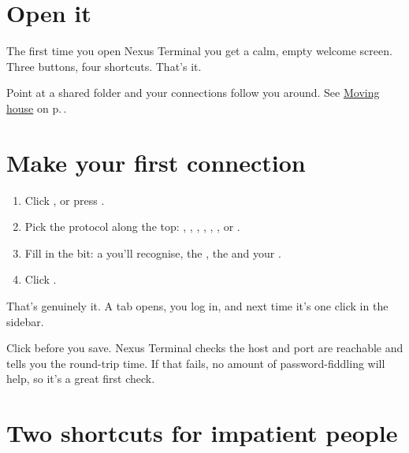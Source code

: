 \section{Open it}

The first time you open Nexus Terminal you get a calm, empty welcome screen. Three buttons, four shortcuts. That's it.


\begin{headsup}
Point  at a shared folder and your connections follow you around. See
\hyperref[ch:move]{Moving house} on p.\,\pageref{ch:move}.
\end{headsup}

\section{Make your first connection}

\begin{enumerate}
  \item Click , or press .
  \item Pick the protocol along the top: , , ,
        , , ,  or .
  \item Fill in the  bit: a  you'll recognise, the , the 
        and your .
  \item Click .
\end{enumerate}

That's genuinely it. A tab opens, you log in, and next time it's one click in the sidebar.


\begin{quickwin}
Click  before you save. Nexus Terminal checks the host and port are reachable and tells you the
round-trip time. If that fails, no amount of password-fiddling will help, so it's a great first check.
\end{quickwin}

\section{Two shortcuts for impatient people}


